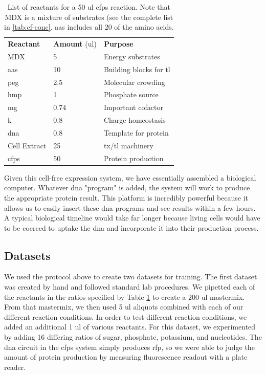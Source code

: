 \begin{table}[]
\centering
\begin{tabular}{lll}
\textbf{Reactant }    & \textbf{Amount} (\gls{ul}) & \textbf{Purpose}                        \\
MDX          & 5               & Energy substrates               \\
\glspl{aa}          & 10              & Building blocks for \gls{tl} \\
\gls{peg}          & 2.5             & Molecular crowding              \\
\gls{hmp}          & 1               & Phosphate source                \\
\gls{mg}           & 0.74            & Important cofactor              \\
\gls{k}            & 0.8             & Charge homeostasis              \\
\gls{dna}          & 0.8             & Template for protein   \\
Cell Extract & 25              & \gls{tx}/\gls{tl} machinery                 \\ \hline
\gls{cfps}         & 50              & Protein production             
\end{tabular}
\caption{List of reactants for a 50 \gls{ul} \gls{cfps} reaction. 
Note that MDX is a mixture of substrates (see the complete list in \ref{tab:cf-conc}.
\glspl{aa} includes all 20 of the amino acids.
}
\label{tab:cf-nrg}
\end{table}

Given this cell-free expression system, we have essentially assembled a biological computer.
Whatever \gls{dna} "program" is added, the system will work to produce the appropriate protein result.
This platform is incredibly powerful because it allows us to easily insert these \gls{dna} programs and see results within a few hours.
A typical biological timeline would take far longer because living cells would have to be coerced to uptake the \gls{dna} and incorporate it into their production process.


\subsection{Datasets}
We used the protocol above to create two datasets for training.
The first dataset was created by hand and followed standard lab procedures.
We pipetted each of the reactants in the ratios specified by Table \ref{tab:cf-nrg} to create a 200 \gls{ul} mastermix. 
From that mastermix, we then used 5 \gls{ul} aliquots combined with each of our different reaction conditions.
In order to test different reaction conditions, we added an additional 1 \gls{ul} of various reactants.
For this dataset, we experimented by adding 16 differing ratios of sugar, phosphate, potassium, and nucleotides.
The \gls{dna} circuit in the \gls{cfps} system simply produces \gls{rfp}, so we were able to judge the amount of protein production by measuring fluorescence readout with a plate reader.

